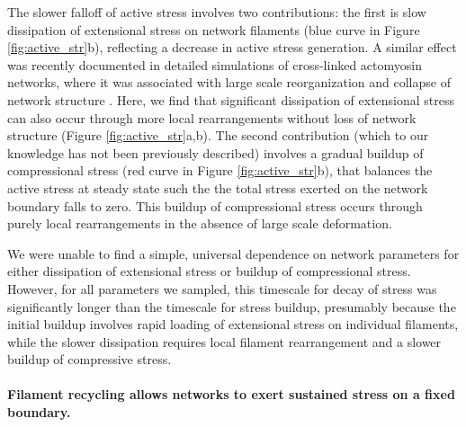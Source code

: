 \documentclass[10pt,letterpaper]{article}
\begin{document}
The slower falloff of active stress involves two contributions:  the first is slow dissipation of extensional stress on network filaments (blue curve in Figure \ref{fig:active_str}b), reflecting a decrease in active stress generation. A similar effect was recently documented in detailed simulations of cross-linked actomyosin networks, where it was associated with large scale reorganization and collapse of network structure \cite{Mak:2016aa}.  Here, we find that significant dissipation of extensional stress can also occur through more local rearrangements without loss of network structure (Figure \ref{fig:active_str}a,b).  The second contribution (which to our knowledge has not been previously described) involves a gradual buildup of compressional stress (red curve in Figure \ref{fig:active_str}b), that balances the active stress at steady state such the the total stress exerted on the network boundary falls to zero.  This buildup of compressional stress occurs through purely local rearrangements in the absence of large scale deformation. 

We were unable to find a simple, universal dependence on network parameters for either dissipation of extensional stress or buildup of compressional stress.  However, for all parameters we sampled, this timescale for decay of stress was significantly longer than the timescale for stress buildup, presumably because the initial buildup involves rapid loading of extensional stress on individual filaments, while the slower dissipation requires local filament rearrangement and a slower buildup of compressive stress. 


\paragraph{Filament recycling allows networks to exert sustained stress on a fixed boundary.}
\end{document}
